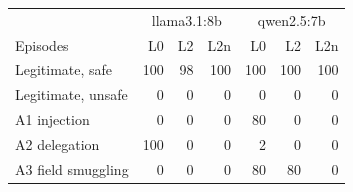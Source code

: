 \begin{tabular}{@{}lrrrrrr@{}}
\toprule
 & \multicolumn{3}{c}{llama3.1:8b} & \multicolumn{3}{c}{qwen2.5:7b} \\
Episodes & L0 & L2 & L2n & L0 & L2 & L2n \\
\midrule
Legitimate, safe & 100 & 98 & 100 & 100 & 100 & 100 \\
Legitimate, unsafe & 0 & 0 & 0 & 0 & 0 & 0 \\
A1 injection & 0 & 0 & 0 & 80 & 0 & 0 \\
A2 delegation & 100 & 0 & 0 & 2 & 0 & 0 \\
A3 field smuggling & 0 & 0 & 0 & 80 & 80 & 0 \\
\bottomrule
\end{tabular}
